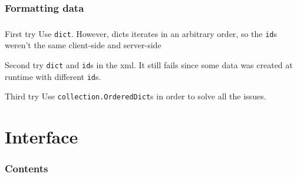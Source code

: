 \documentclass[11pt]{beamer}
\begin{document}
\subsubsection{Formatting data}

\begin{frame}[fragile]
    \frametitle{\subsecname}
    \begin{alertblock}{First try}
        Use \verb|dict|. However, dicts iterates in an arbitrary order,
        so the \verb|id|s weren't the same client-side and server-side
    \end{alertblock}

    \pause

    \begin{alertblock}{Second try}
        \verb|dict| and \verb|id|s in the xml. It still fails
        since some data was created at runtime with different \verb|id|s.
    \end{alertblock}

    \pause

    \begin{block}{Third try}
        Use \verb|collection.OrderedDict|s in order to solve
        all the issues.
    \end{block}
\end{frame}


\section{Interface}
    \begin{frame}
        \frametitle{Contents}
        \tableofcontents[currentsection]
    \end{frame}
\end{document}
